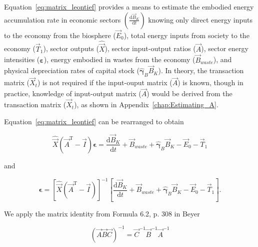 Equation~\ref{eq:matrix_leontief} provides a means to 
estimate the embodied energy accumulation rate
in economic sectors $\left(\frac{\mathrm{d}\vec{B}_{K}}{\mathrm{d}t}\right)$ 
knowing only 
direct energy inputs to the economy from the biosphere ($\vec{E}_{0}$), 
total energy inputs from society to the economy ($\vec{T}_{1}$),
sector outputs ($\hat{\vec{X}}$), 
sector input-output ratios ($\vec{A}$), 
sector energy intensities ($\boldsymbol{\varepsilon}$), 
energy embodied in wastes from the economy ($\vec{B}_{waste}$),
and physical depreciation rates of capital stock ($\hat{\boldsymbol{\gamma}}_{B}\vec{B}_{K}$). 
In theory, the transaction matrix ($\vec{X}_{t}$) is not required 
if the input-ouput matrix ($\vec{A}$) is known, 
though in practice, 
knowledge of input-output matrix ($\vec{A}$) 
would be derived from the transaction matrix ($\vec{X}_{t}$),
as shown in Appendix~\ref{chap:Estimating_A}.



Equation~\ref{eq:matrix_leontief} can be rearranged to obtain

\begin{equation} \label{eq:epsilon_derivation_1}
	\hat{\vec{X}} (\vec{A}^{\mathrm{T}} - \vec{I}) \boldsymbol{\epsilon}
	= \frac{\mathrm{d}\vec{B}_{K}}{\mathrm{d}t}
	+ \vec{B}_{waste}
	+ \hat{\boldsymbol{\gamma}}_{B} \vec{B}_{K}
	- \vec{E}_{0}
	- \vec{T}_{1} 
\end{equation}

\noindent{}and

\begin{equation} \label{eq:epsilon_derivation_2}
	\boldsymbol{\epsilon}
	= {\left[ \hat{\vec{X}} (\vec{A}^{\mathrm{T}} - \vec{I}) \right]}^{-1}
		\left[
			\frac{\mathrm{d}\vec{B}_{K}}{\mathrm{d}t}
			+ \vec{B}_{waste}
			+ \hat{\boldsymbol{\gamma}}_{B} \vec{B}_{K}
			- \vec{E}_{0}
			- \vec{T}_{1} 
		\right].
\end{equation}

\noindent{}We apply the matrix identity 
from Formula 6.2, p. 308 in Beyer~\cite{Beyer:1991vd}

\begin{equation} \label{eq:matrix_identity_Beyer}
	{\left(\vec{A}\vec{B}\vec{C}\right)}^{-1} 
	= \vec{C}^{-1} \vec{B}^{-1} \vec{A}^{-1}
\end{equation}

